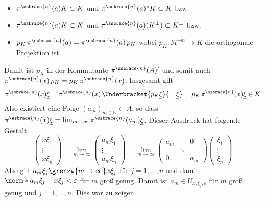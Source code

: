\begin{beweis}
	\begin{itemize}[itemsep=3pt]
		\item $\pi^\ssbrace{n}(a) K \subset K$ und $\pi^\ssbrace{n}(a)^*K \subset K$ bzw.
		\item $\pi^\ssbrace{n}(a) K \subset K$ und $\pi^\ssbrace{n}(a)(K^\bot) \subset K^\bot$ bzw.
		\item $p_K\, \pi^\ssbrace{n}(a)= \pi^\ssbrace{n}(a)\, p_K$ wobei $p_K \colon \mathcal{H}^{\oplus n} \to K$ die orthogonale Projektion ist.
	\end{itemize}
	Damit ist $p_K $ in der Kommutante $ \pi^\ssbrace{n}(A)'$ und somit auch $\pi^\ssbrace{n}(x)\, p_K = p_K \,\pi^\ssbrace{n}(x)$. 
	Insgesamt gilt
	\[
		\pi^\ssbrace{n}(x) \underline{\xi}=\pi^\ssbrace{n}(x)\, \Underbracket{p_K\underline{\xi}}{=\underline{\xi}} = p_K \,\pi^\ssbrace{n}(x) \underline{\xi} \in K
	\]
	Also existiert eine Folge $(a_m)_{m \in \mathbb{N}} \subset A$, so dass $\pi^\ssbrace{n}(x) \underline{\xi} = \lim_{m\to \infty} \pi^\ssbrace{n}(a_m) \underline{\xi}$.
	Dieser Ausdruck hat folgende Gestalt
	\[
		\begin{pmatrix}
			x \xi_1 \\ \vdots \\ x \xi_n 
		\end{pmatrix}
		= \lim_{m \to \infty}
		\begin{pmatrix}
			a_m \xi_1 \\ \vdots \\ a_m \xi_n
		\end{pmatrix}
		= \lim_{m \to \infty}
		\begin{pmatrix}
			a_m & & 0 \\
			& \ddots & \\
			0 & & a_m
		\end{pmatrix}
		\begin{pmatrix}
			\xi_1 \\ \vdots \\ \xi_n
		\end{pmatrix}
	\]
	Also gilt $a_m \xi_j \grenzw{m \to \infty} x \xi_j$ für $j=1,\ldots ,n$ und damit $\norm*{a_m \xi_j - x \xi_j} < \varepsilon$ für $m$ groß genug. 
	Damit ist $a_m \in U_{x,\xi_j,\varepsilon}$ für $m$ groß genug und $j=1,\ldots ,n$.
	Dies war zu zeigen.
\end{beweis}

